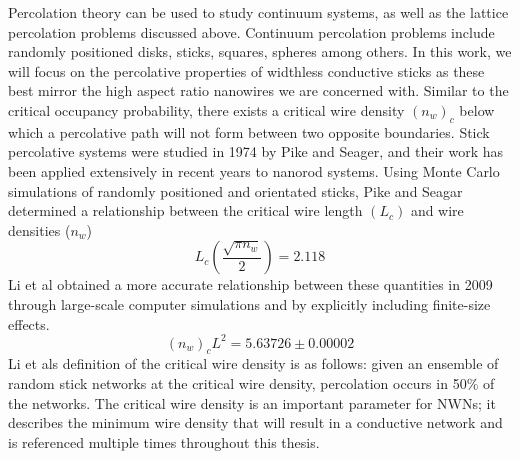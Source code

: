 Percolation theory can be used to study continuum systems, as well as the lattice percolation problems discussed above. Continuum percolation problems include randomly positioned disks, sticks, squares, spheres\cite{pike1974} among others. In this work, we will focus on the percolative properties of widthless conductive sticks as these best mirror the high aspect ratio nanowires we are concerned with. Similar to the critical occupancy probability, there exists a critical wire density $(n_w)_c$ below which a percolative path will not form between two opposite boundaries. Stick percolative systems were studied in 1974 by Pike and Seager\cite{pike1974}, and their work has been applied extensively in recent years to nanorod systems\cite{bergin2012,madaria2010}. Using Monte Carlo simulations of randomly positioned and orientated sticks, Pike and Seagar determined a relationship between the critical wire length $(L_c)$ and wire densities ($n_w$)
\begin{equation}
L_c \left(\frac{\sqrt{\pi n_w}}{2}\right) = 2.118
\end{equation}
Li et al obtained a more accurate relationship between these quantities in 2009 through large-scale computer simulations and by explicitly including finite-size effects\cite{li2009}.
\begin{equation}
(n_w)_c L^2 = 5.63726 \pm  0.00002
\label{eq: critical_wire_density}
\end{equation} 
Li et als definition of the critical wire density is as follows: given an ensemble of random stick networks at the critical wire density, percolation occurs in 50\% of the networks. The critical wire density is an important parameter for NWNs; it describes the minimum wire density that will result in a conductive network and is referenced multiple times throughout this thesis.

